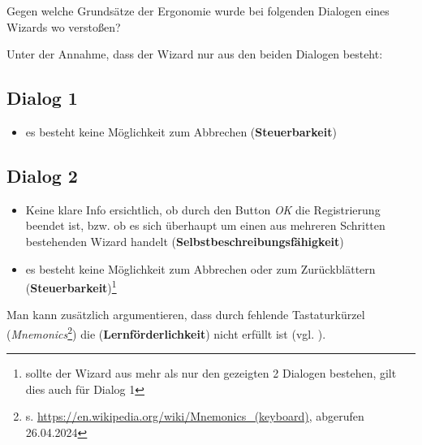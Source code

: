 Gegen welche Grundsätze der Ergonomie wurde bei folgenden Dialogen eines Wizards wo verstoßen?


Unter der Annahme, dass der Wizard nur aus den beiden Dialogen besteht:\\

\subsection*{Dialog 1}
\begin{itemize}
    \item es besteht keine Möglichkeit zum Abbrechen (\textbf{Steuerbarkeit})
\end{itemize}


\subsection*{Dialog 2}
\begin{itemize}
    \item Keine klare Info ersichtlich, ob durch den Button \textit{OK} die Registrierung beendet ist, bzw. ob es sich überhaupt um einen aus mehreren Schritten bestehenden Wizard handelt (\textbf{Selbstbeschreibungsfähigkeit})
    \item es besteht keine Möglichkeit zum Abbrechen oder zum Zurückblättern (\textbf{Steuerbarkeit})\footnote{
    sollte der Wizard aus mehr als nur den gezeigten 2 Dialogen bestehen, gilt dies auch für Dialog 1
    }
\end{itemize}

\noindent
Man kann zusätzlich argumentieren, dass durch fehlende Tastaturkürzel (\textit{Mnemonics}\footnote{
    s. \url{https://en.wikipedia.org/wiki/Mnemonics_(keyboard)}, abgerufen 26.04.2024
}) die (\textbf{Lernförderlichkeit}) nicht erfüllt ist (vgl. \cite[147]{Rau07f}).